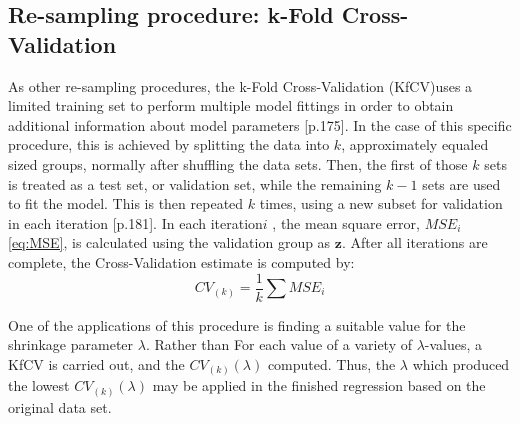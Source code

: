 \documentclass[%
oneside,                 %
final,                   %
10pt]{article}
\begin{document}
\subsection{Re-sampling procedure: k-Fold Cross-Validation} \label{M:kfold}
As other re-sampling procedures, the k-Fold Cross-Validation (KfCV)uses a limited training set to perform multiple model fittings in order to obtain additional information about model parameters \citep{2017introstatlearn}[p.175]. In the case of this specific procedure, this is achieved by splitting the data into $k$, approximately equaled sized groups, normally after shuffling the data sets. Then, the first of those $k$ sets is treated as a test set, or validation set, while the remaining $k-1$ sets are used to fit the model. This is then repeated $k$ times, using a new subset for validation in each iteration \citep{2017introstatlearn}[p.181]. In each iteration$ i$ , the mean square error, $MSE_i$ \eqref{eq:MSE}, is calculated using the validation group as $\bm{z}$. After all iterations are complete, the Cross-Validation estimate is computed by:
\begin{equation}
CV_(k)=\frac{1}{k}\sum MSE_i
\end{equation}

One of the applications of this procedure is finding a suitable value for the shrinkage parameter $\lambda$. Rather than For each value of a variety of $\lambda$-values, a KfCV is carried out, and the $CV_(k)(\lambda)$ computed. Thus, the $\lambda$ which produced the lowest $CV_(k)(\lambda)$ may be applied in the finished regression based on the original data set.
\end{document}
